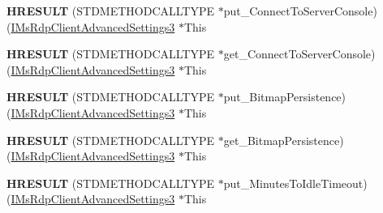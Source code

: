 \begin{DoxyCompactItemize}
\item 
\mbox{\label{struct_m_s_t_s_c_lib_1_1_i_ms_rdp_client_advanced_settings3_vtbl_a5bc8a03a5888d0acdf104d2aebc69e35}} 
{\bfseries H\+R\+E\+S\+U\+LT} (S\+T\+D\+M\+E\+T\+H\+O\+D\+C\+A\+L\+L\+T\+Y\+PE $\ast$put\+\_\+\+Connect\+To\+Server\+Console)(\hyperlink{interface_m_s_t_s_c_lib_1_1_i_ms_rdp_client_advanced_settings3}{I\+Ms\+Rdp\+Client\+Advanced\+Settings3} $\ast$This
\item 
\mbox{\label{struct_m_s_t_s_c_lib_1_1_i_ms_rdp_client_advanced_settings3_vtbl_a5619ad41ba9a7958a6f9bb773e6c06e3}} 
{\bfseries H\+R\+E\+S\+U\+LT} (S\+T\+D\+M\+E\+T\+H\+O\+D\+C\+A\+L\+L\+T\+Y\+PE $\ast$get\+\_\+\+Connect\+To\+Server\+Console)(\hyperlink{interface_m_s_t_s_c_lib_1_1_i_ms_rdp_client_advanced_settings3}{I\+Ms\+Rdp\+Client\+Advanced\+Settings3} $\ast$This
\item 
\mbox{\label{struct_m_s_t_s_c_lib_1_1_i_ms_rdp_client_advanced_settings3_vtbl_a05699aa24511c298aef662fbc4ca7929}} 
{\bfseries H\+R\+E\+S\+U\+LT} (S\+T\+D\+M\+E\+T\+H\+O\+D\+C\+A\+L\+L\+T\+Y\+PE $\ast$put\+\_\+\+Bitmap\+Persistence)(\hyperlink{interface_m_s_t_s_c_lib_1_1_i_ms_rdp_client_advanced_settings3}{I\+Ms\+Rdp\+Client\+Advanced\+Settings3} $\ast$This
\item 
\mbox{\label{struct_m_s_t_s_c_lib_1_1_i_ms_rdp_client_advanced_settings3_vtbl_a4e3938fc26d2e85b799833ca80d943ae}} 
{\bfseries H\+R\+E\+S\+U\+LT} (S\+T\+D\+M\+E\+T\+H\+O\+D\+C\+A\+L\+L\+T\+Y\+PE $\ast$get\+\_\+\+Bitmap\+Persistence)(\hyperlink{interface_m_s_t_s_c_lib_1_1_i_ms_rdp_client_advanced_settings3}{I\+Ms\+Rdp\+Client\+Advanced\+Settings3} $\ast$This
\item 
\mbox{\label{struct_m_s_t_s_c_lib_1_1_i_ms_rdp_client_advanced_settings3_vtbl_ac7c665be884d002eef2b15d994455af7}} 
{\bfseries H\+R\+E\+S\+U\+LT} (S\+T\+D\+M\+E\+T\+H\+O\+D\+C\+A\+L\+L\+T\+Y\+PE $\ast$put\+\_\+\+Minutes\+To\+Idle\+Timeout)(\hyperlink{interface_m_s_t_s_c_lib_1_1_i_ms_rdp_client_advanced_settings3}{I\+Ms\+Rdp\+Client\+Advanced\+Settings3} $\ast$This

\end{DoxyCompactItemize}
